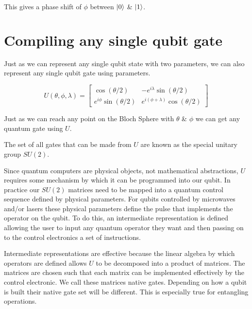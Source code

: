 This gives a phase shift of $\phi$ between $\ket{0}$ \& $\ket{1}$. 


\section{ Compiling any single qubit gate }

Just as we can represent any single qubit state with two parameters, we can also represent any single qubit gate using parameters. 

$$
U(\theta, \phi, \lambda) = \begin{bmatrix} \cos(\theta/2) & -e^{i\lambda}\sin(\theta/2) \\ e^{i\phi}\sin(\theta/2) & e^{i(\phi + \lambda)}\cos(\theta/2) \end{bmatrix} 
$$

Just as we can reach any point on the Bloch Sphere with $\theta$ \& $\phi$ we can get any quantum gate using $U$. 

The set of all gates that can be made from $U$ are known as the special unitary group $SU(2)$.

Since quantum computers are physical objects, not mathematical abstractions, $U$ requires some mechanism by which it can be programmed into our qubit. In practice our $SU(2)$ matrices need to be mapped into a quantum control sequence defined by physical parameters. For qubits controlled by microwaves and/or lasers these physical parameters define the pulse that implements the operator on the qubit. To do this, an intermediate representation is defined allowing the user to input any quantum operator they want and then passing on to the control electronics a set of instructions.

Intermediate representations are effective because the linear algebra by which operators are defined allows $U$ to be decomposed into a product of matrices. The matrices are chosen such that each matrix can be implemented effectively by the control electronic. We call these matrices native gates. Depending on how a qubit is built their native gate set will be different. This is especially true for entangling operations. 



